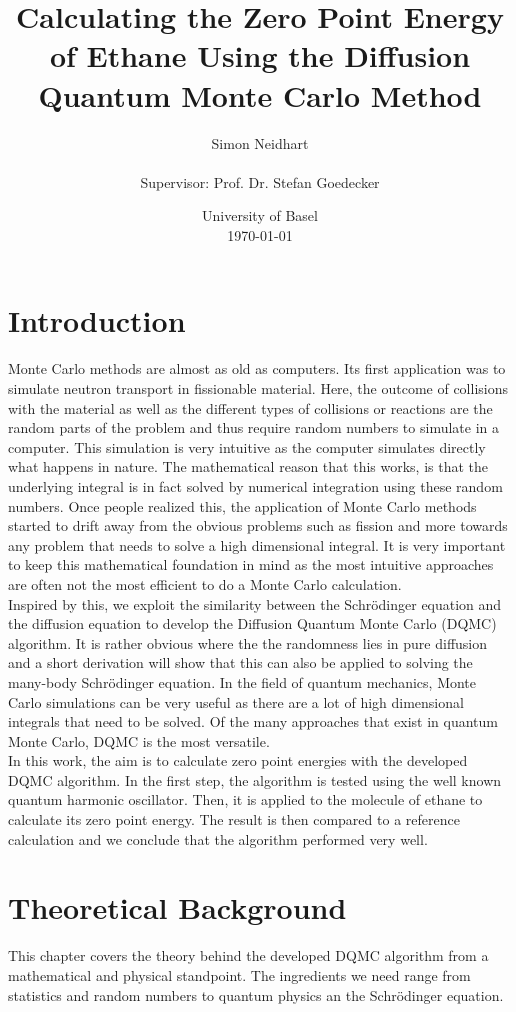 \documentclass [12pt]{report}
\title{Calculating the Zero Point Energy of Ethane Using the Diffusion Quantum Monte Carlo Method}
\author{Simon Neidhart \\ \\ Supervisor: Prof. Dr. Stefan Goedecker}
\date{University of Basel \\ \today}
\begin{document}
\maketitle
\tableofcontents
\newpage
\chapter{Introduction}
Monte Carlo methods are almost as old as computers. Its first application was to simulate neutron transport in fissionable material. Here, the outcome of collisions with the material as well as the different types of collisions or reactions are the random parts of the problem and thus require random numbers to simulate in a computer. This simulation is very intuitive as the computer simulates directly what happens in nature. The mathematical reason that this works, is that the underlying integral is in fact solved by numerical integration using these random numbers. Once people realized this, the application of Monte Carlo methods started to drift away from the obvious problems such as fission and more towards any problem that needs to solve a high dimensional integral. It is very important to keep this mathematical foundation in mind as the most intuitive approaches are often not the most efficient to do a Monte Carlo calculation.\\
Inspired by this, we exploit the similarity between the Schrödinger equation and the diffusion equation to develop the Diffusion Quantum Monte Carlo (DQMC) algorithm. It is rather obvious where the the randomness lies in pure diffusion and a short derivation will show that this can also be applied to solving the many-body Schrödinger equation. In the field of quantum mechanics, Monte Carlo simulations can be very useful as there are a lot of high dimensional integrals that need to be solved. Of the many approaches that exist in quantum Monte Carlo, DQMC is the most versatile.\\
In this work, the aim is to calculate zero point energies with the developed DQMC algorithm. In the first step, the algorithm is tested using the well known quantum harmonic oscillator. Then, it is applied to the molecule of ethane to calculate its zero point energy. The result is then compared to a reference calculation and we conclude that the algorithm performed very well.

\chapter{Theoretical Background}
This chapter covers the theory behind the developed DQMC algorithm from a mathematical and physical standpoint. The ingredients we need range from statistics and random numbers to quantum physics an the Schrödinger equation.
\end{document}
